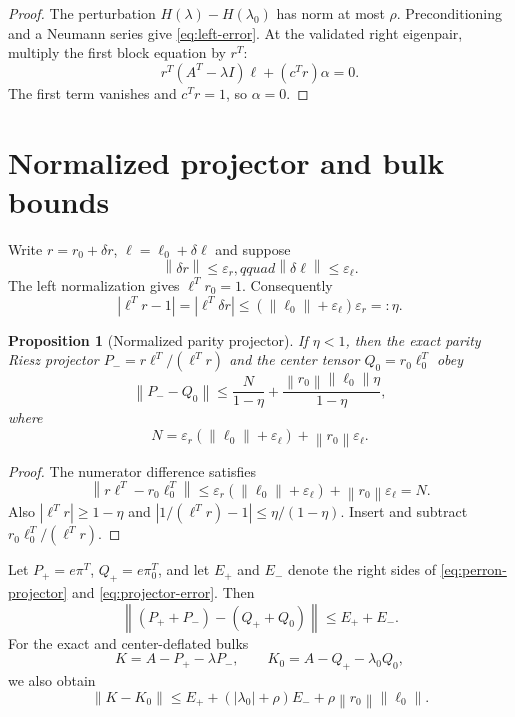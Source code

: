 \documentclass[11pt]{article}
\newtheorem{proposition}[theorem]{Proposition}
\theoremstyle{definition}
\newcommand{\norm}[1]{\left\lVert#1\right\rVert}
\begin{document}
\begin{proof}
The perturbation $H(\lambda)-H(\lambda_0)$ has norm at most $\rho$.
Preconditioning and a Neumann series give \eqref{eq:left-error}.  At the
validated right eigenpair, multiply the first block equation by $r^T$:
\[
 r^T(A^T-\lambda I)\ell+(c^Tr)\alpha=0.
\]
The first term vanishes and $c^Tr=1$, so $\alpha=0$.
\end{proof}

\section{Normalized projector and bulk bounds}
\label{sec:projector}

Write $r=r_0+\delta r$, $\ell=\ell_0+\delta\ell$ and suppose
\[
 \norm{\delta r}\le\varepsilon_r,qquad
 \norm{\delta\ell}\le\varepsilon_\ell.
\]
The left normalization gives $\ell^Tr_0=1$.  Consequently
\[
 |\ell^Tr-1|
 =|\ell^T\delta r|
 \le(\norm{\ell_0}+\varepsilon_\ell)\varepsilon_r
 =:\eta.
\]

\begin{proposition}[Normalized parity projector]
\label{prop:projector}
If $\eta<1$, then the exact parity Riesz projector
$P_-=r\ell^T/(\ell^Tr)$ and the center tensor $Q_0=r_0\ell_0^T$ obey
\begin{equation}
 \norm{P_--Q_0}
 \le
 \frac{N}{1-\eta}
 +\frac{\norm{r_0}\norm{\ell_0}\eta}{1-\eta},
 \label{eq:projector-error}
\end{equation}
where
\[
 N=\varepsilon_r(\norm{\ell_0}+\varepsilon_\ell)
   +\norm{r_0}\varepsilon_\ell.
\]
\end{proposition}

\begin{proof}
The numerator difference satisfies
\[
 \norm{r\ell^T-r_0\ell_0^T}
 \le\varepsilon_r(\norm{\ell_0}+\varepsilon_\ell)
      +\norm{r_0}\varepsilon_\ell=N.
\]
Also $|\ell^Tr|\ge1-\eta$ and
$|1/(\ell^Tr)-1|\le\eta/(1-\eta)$.  Insert and subtract
$r_0\ell_0^T/(\ell^Tr)$.
\end{proof}

Let $P_+=e\pi^T$, $Q_+=e\pi_0^T$, and let $E_+$ and $E_-$ denote the
right sides of \eqref{eq:perron-projector} and
\eqref{eq:projector-error}.  Then
\begin{equation}
 \norm{(P_++P_-)-(Q_++Q_0)}\le E_++E_-.
 \label{eq:rank-two}
\end{equation}
For the exact and center-deflated bulks
\[
 K=A-P_+-\lambda P_- ,
 \qquad K_0=A-Q_+-\lambda_0Q_0,
\]
we also obtain
\begin{equation}
 \norm{K-K_0}
 \le E_++(|\lambda_0|+\rho)E_-
      +\rho\norm{r_0}\norm{\ell_0}.
 \label{eq:bulk}
\end{equation}
\end{document}
